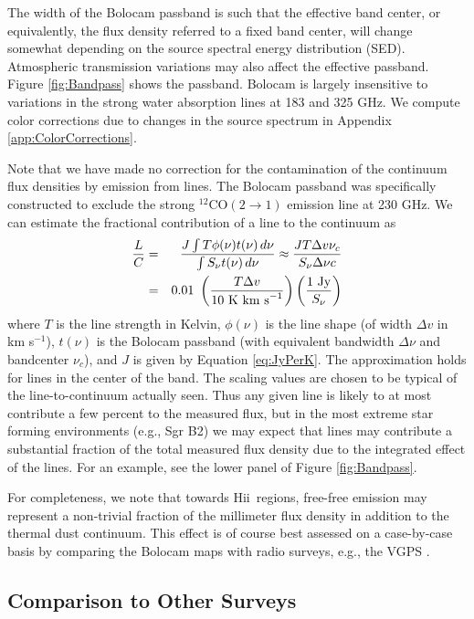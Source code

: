 \documentclass[12pt,preprint]{aastex}
\newcommand{\eg}{{e.g.\/}}
\newcommand{\hii}{H{\sc ii}}
\begin{document}
The width of the Bolocam passband is such that the effective band
center, or equivalently, the flux density referred to a fixed band
center, will change somewhat depending on the source spectral energy
distribution (SED).  Atmospheric transmission variations may also
affect the effective passband.  Figure \ref{fig:Bandpass} shows the
passband.  Bolocam is largely insensitive to variations in the strong
water absorption lines at 183 and 325 GHz.  We compute color
corrections due to changes in the source spectrum in Appendix
\ref{app:ColorCorrections}.

Note that we have made no correction for the contamination of the
continuum flux densities by emission from lines.  The Bolocam passband
was specifically constructed to exclude the strong $^{12}\mathrm{CO}(2
\to 1)$ emission line at 230 GHz.  We can estimate the fractional
contribution of a line to the continuum as
\begin{eqnarray}
\label{eq:LineContamination}
\nonumber \frac{L}{C} & = & 
\frac{J \int T \phi(\nu) t(\nu) \,d \nu}{\int S_\nu t(\nu) \,d \nu} 
\approx \frac{J T \Delta v \nu_c}{S_\nu \Delta \nu c} \\
& = & 0.01~\left(\frac{T \Delta v}{10~\rm{K~km~s}^{-1}}\right) 
\left(\frac{\rm{1~Jy}}{S_\nu}\right)
\end{eqnarray}
where $T$ is the line strength in Kelvin, $\phi(\nu)$ is the line
shape (of width $\Delta v$ in km s$^{-1}$), $t(\nu)$ is the Bolocam
passband (with equivalent bandwidth $\Delta \nu$ and bandcenter
$\nu_c$), and $J$ is given by Equation \ref{eq:JyPerK}.  The
approximation holds for lines in the center of the band.  The scaling
values are chosen to be typical of the line-to-continuum actually
seen.  Thus any given line is likely to at most contribute a few
percent to the measured flux, but in the most extreme star forming
environments (\eg, Sgr B2) we may expect that lines may contribute a
substantial fraction of the total measured flux density due to the
integrated effect of the lines.  For an example, see the lower panel
of Figure \ref{fig:Bandpass}.

For completeness, we note that towards \hii\ regions, free-free
emission may represent a non-trivial fraction of the millimeter flux
density in addition to the thermal dust continuum.  This effect is of
course best assessed on a case-by-case basis by comparing the Bolocam
maps with radio surveys, e.g., the VGPS \citep{stil06}.

\subsection{Comparison to Other Surveys}
\label{sec:FluxComparison}
\end{document}

